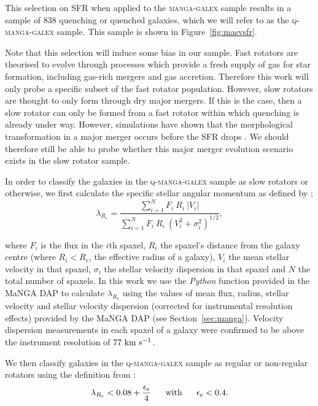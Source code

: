 \documentclass[useAMS,usenatbib]{mn2e}
\begin{document}
This selection on SFR when applied to the \textsc{manga-galex} sample results in a sample of $838$ quenching or quenched galaxies, which we will refer to as the \textsc{q-manga-galex} sample. This sample is shown in Figure~\ref{fig:masvsfr}.

Note that this selection will induce some bias in our sample. Fast rotators are theorised to evolve through processes which provide a fresh supply of gas for star formation, including gas-rich mergers and gas accretion. Therefore this work will only probe a specific subset of the fast rotator population. However, slow rotators are thought to only form through dry major mergers. If this is the case, then a slow rotator can only be formed from a fast rotator within which quenching is already under way. However, simulations have shown that the morphological transformation in a major merger occurs before the SFR drops \cite[e.g. see][]{sparre16}. We should therefore still be able to probe whether this major merger evolution scenario exists in the slow rotator sample.  

In order to classify the galaxies in the \textsc{q-manga-galex} sample as slow rotators or otherwise, we first calculate the specific stellar angular momentum as defined by \cite{emsellem07, emsellem11};
\begin{equation}
\lambda_{R_{e}} = \frac{\sum_{i=1}^{N} F_i\ R_i\ |V_i|}{\sum_{i=1}^{N} F_i\ R_i\ (V_i^2 + \sigma_i^2)^{1/2}},
\end{equation}	

where $F_i$ is the flux in the $i$th spaxel, $R_i$ the spaxel's distance from the galaxy centre (where $R_i < R_e$, the effective radius of a galaxy), $V_i$ the mean stellar velocity in that spaxel, $\sigma_i$ the stellar velocity dispersion in that spaxel and $N$ the total number of spaxels. In this work we use the \emph{Python} function provided in the MaNGA DAP to calculate $\lambda_{R_{e}}$ using the values of mean flux, radius, stellar velocity and stellar velocity dispersion (corrected for instrumental resolution effects) provided  by the MaNGA DAP (see Section~\ref{sec:manga}). Velocity dispersion measurements in each spaxel of a galaxy were confirmed to be above the instrument resolution of $77~\rm{km}~\rm{s}^{-1}$.

We then classify galaxies in the \textsc{q-manga-galex} sample as regular or non-regular rotators using the definition from \cite{cappellari16}:
\begin{equation}\label{eq:fvs}
\lambda_{R_{e}} < 0.08 + \frac{\epsilon_e}{4} ~~~~~ \rm{with} ~~~~~ \epsilon_e < 0.4.
\end{equation}
\end{document}
